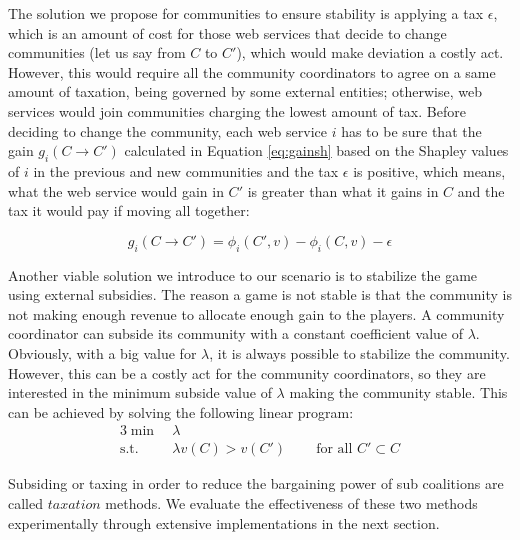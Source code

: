 \documentclass[10pt,journal,cspaper,compsoc]{IEEEtran}
\begin{document}
The solution we propose for communities to ensure stability is
applying a tax $\epsilon$, which is an amount of cost for those
web services that decide to change communities (let us say from
$C$ to $C'$), which would make deviation a costly act. However,
this would require all the community coordinators to agree on a
same amount of taxation, being governed by some external entities;
otherwise, web services would join communities charging the lowest
amount of tax. Before deciding to change the community, each web
service $i$ has to be sure that the gain $g_i(C \rightarrow C')$
calculated in Equation \ref{eq:gainsh} based on the Shapley values
of $i$ in the previous and new communities and the tax $\epsilon$
is positive, which means, what the web service would gain in $C'$
is greater than what it gains in $C$ and the tax it would pay if
moving all together:


\begin{equation}\label{eq:gainsh}
g_i(C \rightarrow C') = \phi_i(C',v) - \phi_i(C,v) - \epsilon
\end{equation}


Another viable solution we introduce to our scenario is to
stabilize the game using external subsidies. The reason a game is
not stable is that the community is not making enough revenue to
allocate enough gain to the players. A community coordinator can
subside its community with a constant coefficient value of
$\lambda$.
%
%
Obviously, with a big value for $\lambda$, it is always possible
to stabilize the community. However, this can be a costly act for
the community coordinators, so they are interested in the minimum
subside value of $\lambda$ making the community stable. This can
be achieved by solving the following linear program:
%
  \begin{alignat*}{3}
    \min~   & \lambda  \\
    \text{s.t. } & \lambda v(C) > v(C') & ~& \text{ for all } C' \subset C
  \end{alignat*}


Subsiding or taxing in order to reduce the
bargaining power of sub coalitions are called $taxation$
\cite{eps346856} methods. We evaluate the effectiveness of these
two methods experimentally through extensive implementations in
the next section.
\end{document}
